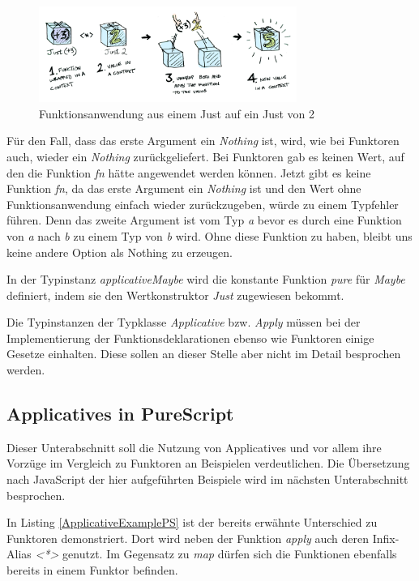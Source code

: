 \documentclass[
12pt,
ngerman,
oneside]
{scrbook} %
\begin{document}
\begin{figure}[htb!]
	\centering
	\includegraphics[width=0.75\textwidth]{Pictures/applicative-just.png}
	\caption{Funktionsanwendung aus einem Just auf ein Just von 2 \cite[][]{AdityaBhargava13}}
	\label{fig:MaybeApplicativeJust}
\end{figure}

Für den Fall, dass das erste Argument ein \emph{Nothing} ist, wird, wie bei Funktoren auch, wieder ein \emph{Nothing} zurückgeliefert. Bei Funktoren gab es keinen Wert, auf den die Funktion \emph{fn} hätte angewendet werden können. Jetzt gibt es keine Funktion \emph{fn}, da das erste Argument ein \emph{Nothing} ist und den Wert ohne Funktionsanwendung einfach wieder zurückzugeben, würde zu einem Typfehler führen. Denn das zweite Argument ist vom Typ \emph{a} bevor es durch eine Funktion von \emph{a} nach \emph{b} zu einem Typ von \emph{b} wird. Ohne diese Funktion zu haben, bleibt uns keine andere Option als Nothing zu erzeugen.

In der Typinstanz \emph{applicativeMaybe} wird die konstante Funktion \emph{pure} für \emph{Maybe} definiert, indem sie den Wertkonstruktor \emph{Just} zugewiesen bekommt.

Die Typinstanzen der Typklasse \emph{Applicative} bzw. \emph{Apply} müssen bei der Implementierung der Funktionsdeklarationen ebenso wie Funktoren einige Gesetze einhalten. Diese sollen an dieser Stelle aber nicht im Detail besprochen werden.

\subsection{Applicatives in PureScript}
Dieser Unterabschnitt soll die Nutzung von Applicatives und vor allem ihre Vorzüge im Vergleich zu Funktoren an Beispielen verdeutlichen. Die Übersetzung nach JavaScript der hier aufgeführten Beispiele wird im nächsten Unterabschnitt besprochen.

In Listing \ref{ApplicativeExamplePS} ist der bereits erwähnte Unterschied zu Funktoren demonstriert. Dort wird neben der Funktion \emph{apply} auch deren Infix-Alias \emph{<*>} genutzt. Im Gegensatz zu \emph{map} dürfen sich die Funktionen ebenfalls bereits in einem Funktor befinden.
\end{document}
